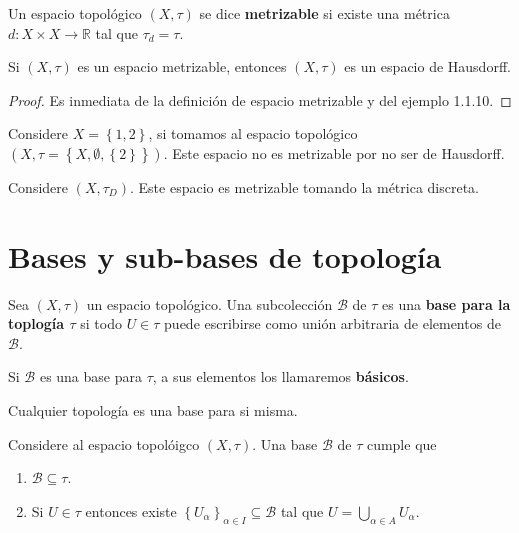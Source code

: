 \documentclass[12pt]{report}
\theoremstyle{largebreak}
\newcommand\cf[3]{\ensuremath{#1:#2\rightarrow#3}}
\begin{document}
    \begin{mydef}
        Un espacio topológico $(X,\tau)$ se dice \textbf{metrizable} si existe una métrica $\cf{d}{X\times X}{\mathbb{R}}$ tal que $\tau_d=\tau$. 
    \end{mydef}

    \begin{propo}
        Si $(X,\tau)$ es un espacio metrizable, entonces $(X,\tau)$ es un espacio de Hausdorff.
    \end{propo}

    \begin{proof}
        Es inmediata de la definición de espacio metrizable y del ejemplo 1.1.10.
    \end{proof}

    \begin{exa}
        Considere $X=\left\{1,2\right\}$, si tomamos al espacio topológico $(X,\tau=\left\{X,\emptyset,\left\{2\right\} \right\})$. Este espacio no es metrizable por no ser de Hausdorff.
    \end{exa}

    \begin{exa}
        Considere $(X,\tau_D)$. Este espacio es metrizable tomando la métrica discreta.
    \end{exa}

    \section{Bases y sub-bases de topología}

    \begin{mydef}
        Sea $(X,\tau)$ un espacio topológico. Una subcolección $\mathcal{B}$ de $\tau$ es una \textbf{base para la toplogía $\tau$} si todo $U\in \tau$ puede escribirse como unión arbitraria de elementos de $\mathcal{B}$.

        Si $\mathcal{B}$ es una base para $\tau$, a sus elementos los llamaremos \textbf{básicos}.
    \end{mydef}

    \begin{obs}
        Cualquier topología es una base para si misma.
    \end{obs}

    Considere al espacio topolóigco $(X,\tau)$. Una base $\mathcal{B}$ de $\tau$ cumple que
    \begin{enumerate}
        \item $\mathcal{B}\subseteq\tau$.
        \item Si $U\in\tau$ entonces existe $\left\{U_\alpha\right\}_{\alpha\in I}\subseteq\mathcal{B}$ tal que $U=\bigcup_{\alpha\in A}U_\alpha$.
    \end{enumerate}
\end{document}
